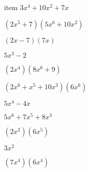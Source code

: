 \documentclass{article}
\begin{document}
\begin{multicols}{2}
item $3x^{4}+10x^2+7x$\item $(2x^{5}+7)(5x^{6}+10x^2)$\item $(2x-7)(7x)$\item $5x^{3}-2$\item $(2x^{4})(8x^{6}+9)$\item $(2x^{6}+x^{5}+10x^{3})(6x^{6})$\item $5x^{4}-4x$\item $5x^{6}+7x^{5}+8x^{3}$\item $(2x^2)(6x^{5})$\item $3x^2$\item $(7x^{4})(6x^{4})$
\end{multicols}
\end{document}

